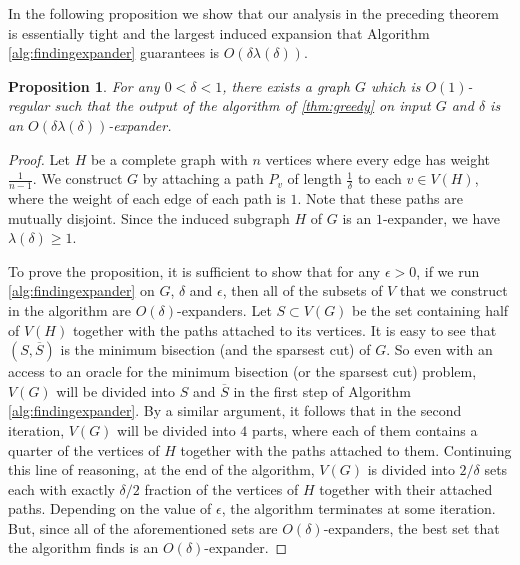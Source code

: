 \documentclass[11pt]{article}
\def\eps{\epsilon}
\newtheorem{proposition}[theorem]{Proposition}
\begin{document}
In the following proposition we show that our analysis in the preceding theorem is essentially 
tight and the largest induced expansion that Algorithm \ref{alg:findingexpander} guarantees is $O(\delta \lambda(\delta))$. 
\begin{proposition}\label{prop:tightgreedy}
For any $0 < \delta < 1$, there exists a graph $G$ which is $O(1)$-regular such that the output of the algorithm of \autoref{thm:greedy} on input $G$ and $\delta $ is an  $O(\delta \lambda(\delta))$-expander. 
\end{proposition}
\begin{proof}
Let $H$ be a complete graph with $n$ vertices where every edge has weight $\frac1{n-1}$. We construct $G$ by attaching a path $P_v$ of length $\frac1\delta$ to each $v \in V(H)$, where the weight of each edge of each path is $1$.  Note that these paths are mutually disjoint. Since the induced subgraph $H$ of $G$ is an $1$-expander, we have $\lambda(\delta)\geq 1$.


To prove the proposition, it is sufficient to show that for any $\eps>0$,  if we run  \autoref{alg:findingexpander} on $G$, $\delta$ and $\eps$, then
all of the subsets of $V$ that we construct in the algorithm are $O(\delta)$-expanders. 
Let $S \subset V(G)$ be the set containing half of $V(H)$ together with the paths attached to its vertices. It is easy to see that $(S,\overline{S})$ is the minimum bisection (and the sparsest cut) of $G$. 
So even with an access to an oracle for the minimum bisection (or the sparsest cut) problem,
$V(G)$ will be divided into $S$ and $\overline{S}$ in the first step of Algorithm \ref{alg:findingexpander}. By a similar argument, it follows that in the second iteration, $V(G)$ will be divided into $4$ parts, where each of them contains a quarter of the vertices of $H$ together with the paths attached to them. Continuing this line of reasoning, at the end of the algorithm, $V(G)$ is divided into $2/\delta$ sets each with exactly $\delta/2$ fraction of the vertices of $H$ together with their attached paths. 
Depending on the value of $\eps$, the algorithm terminates at some iteration. But, since  all of the aforementioned sets are $O(\delta)$-expanders, the best set that the algorithm  finds is an $O(\delta)$-expander.
\end{proof}
\end{document}
